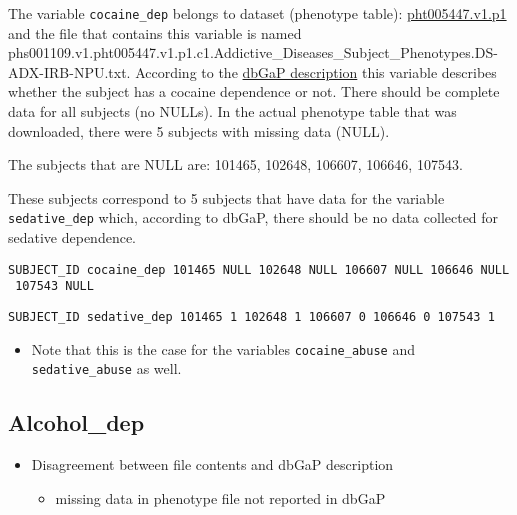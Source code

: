 \documentclass[11pt]{article}
\providecommand{\tightlist}{%
      \setlength{\itemsep}{0pt}\setlength{\parskip}{0pt}}
\begin{document}
The variable \texttt{cocaine\_dep} belongs to dataset (phenotype table):
\href{https://www.ncbi.nlm.nih.gov/projects/gap/cgi-bin/dataset.cgi?study_id=phs001109.v1.p1\&phv=261905\&phd=6837\&pha=\&pht=5447\&phvf=1\&phdf=\&phaf=\&phtf=1\&dssp=1\&consent=\&temp=1}{pht005447.v1.p1}
and the file that contains this variable is named
phs001109.v1.pht005447.v1.p1.c1.Addictive\_Diseases\_Subject\_Phenotypes.DS-ADX-IRB-NPU.txt.
According to the
\href{https://www.ncbi.nlm.nih.gov/projects/gap/cgi-bin/variable.cgi?study_id=phs001109.v1.p1\&phv=261906\&phd=6837\&pha=\&pht=5447\&phvf=1\&phdf=\&phaf=\&phtf=1\&dssp=1\&consent=\&temp=1}{dbGaP
description} this variable describes whether the subject has a cocaine
dependence or not. There should be complete data for all subjects (no
NULLs). In the actual phenotype table that was downloaded, there were 5
subjects with missing data (NULL).

The subjects that are NULL are: 101465, 102648, 106607, 106646, 107543.

These subjects correspond to 5 subjects that have data for the variable
\texttt{sedative\_dep} which, according to dbGaP, there should be no
data collected for sedative dependence.

\texttt{SUBJECT\_ID\ cocaine\_dep\ 101465\ NULL\ 102648\ NULL\ 106607\ NULL\ 106646\ NULL\ 107543\ NULL}

\texttt{SUBJECT\_ID\ sedative\_dep\ 101465\ 1\ 102648\ 1\ 106607\ 0\ 106646\ 0\ 107543\ 1}

\begin{itemize}
\tightlist
\item
  Note that this is the case for the variables \texttt{cocaine\_abuse}
  and \texttt{sedative\_abuse} as well.
\end{itemize}

    \subsection{Alcohol\_dep}\label{alcohol_dep}

\begin{itemize}
\tightlist
\item
  Disagreement between file contents and dbGaP description

  \begin{itemize}
  \tightlist
  \item
    missing data in phenotype file not reported in dbGaP
  \end{itemize}
\end{itemize}
\end{document}
